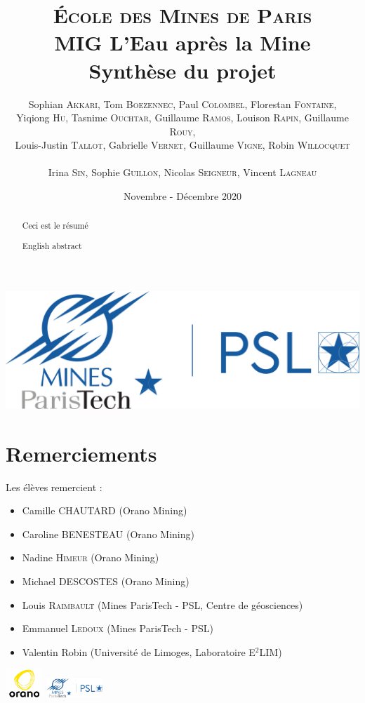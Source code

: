 \documentclass{article}
\title{\textbf{\LARGE{\textsc{École des Mines de Paris}}\\ \vspace{1 cm}MIG L'Eau après la Mine\\\vspace{0.8 cm}Synthèse du projet}\vspace{1 cm}}
\author{Sophian \textsc{Akkari}, Tom \textsc{Boezennec}, Paul \textsc{Colombel}, Florestan \textsc{Fontaine},\\ Yiqiong \textsc{Hu}, Tasnime \textsc{Ouchtar}, Guillaume \textsc{Ramos}, Louison \textsc{Rapin}, Guillaume \textsc{Rouy},\\ Louis-Justin \textsc{Tallot}, Gabrielle \textsc{Vernet}, Guillaume \textsc{Vigne}, Robin \textsc{Willocquet}\\ \\ Irina \textsc{Sin}, Sophie \textsc{Guillon}, Nicolas \textsc{Seigneur}, Vincent \textsc{Lagneau}}
\date{\vspace{2 cm}Novembre - Décembre 2020}
\begin{document}

\maketitle
\thispagestyle{empty}
\vspace{2 cm}
\begin{center}
    \includegraphics[width = 0.4\linewidth]{logoMPT.png}
\end{center}
\newpage
{}
\section*{Remerciements}

Les élèves remercient : 
\begin{itemize}
    \item Camille \textsc{CHAUTARD} (Orano Mining)
    \item Caroline \textsc{BENESTEAU} (Orano Mining)
    \item Nadine \textsc{Himeur} (Orano Mining)
    \item Michael \textsc{DESCOSTES} (Orano Mining) 
    \item Louis \textsc{Raimbault} (Mines ParisTech - PSL, Centre de géosciences) 
    \item  Emmanuel \textsc{Ledoux} (Mines ParisTech - PSL)
    \item Valentin Robin (Université de Limoges, Laboratoire
E$^2$LIM) 
\end{itemize}
\includegraphics[width = 40pt]{oranologo.png} \includegraphics[height = 20pt ]{logoMPT.png}
\newpage
{}
\tableofcontents

\newpage

\begin{abstract}
    Ceci est le résumé
\end{abstract}


{
\begin{abstract}
    English abstract
\end{abstract}
}
\end{document}
